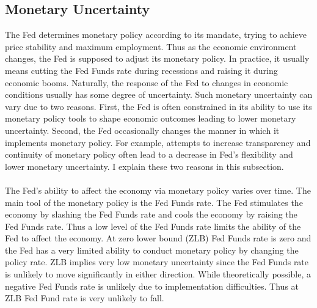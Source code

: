 \documentclass[12pt]{article}
\begin{document}
\subsection{Monetary Uncertainty} \label{sec:Model}

The Fed determines monetary policy according to its mandate, trying to achieve price stability and maximum employment. Thus as the economic environment changes, the Fed is supposed to adjust its monetary policy. In practice, it usually means cutting the Fed Funds rate during recessions and raising it during economic booms. Naturally, the response of the Fed to changes in economic conditions usually has some degree of uncertainty. Such monetary uncertainty can vary due to two reasons. First, the Fed is often constrained in its ability to use its monetary policy tools to shape economic outcomes leading to lower monetary uncertainty. Second, the Fed occasionally changes the manner in which it implements monetary policy. For example, attempts to increase transparency and continuity of monetary policy often lead to a decrease in Fed's flexibility and lower monetary uncertainty. I explain these two reasons in this subsection.
\paragraph{}
The Fed's ability to affect the economy via monetary policy varies over time. The main tool of the monetary policy is the Fed Funds rate. The Fed stimulates the economy by slashing the Fed Funds rate and cools the economy by raising the Fed Funds rate. Thus a low level of the Fed Funds rate limits the ability of the Fed to affect the economy. At zero lower bound (ZLB) Fed Funds rate is zero and the Fed has a very limited ability to conduct monetary policy by changing the policy rate. ZLB implies very low monetary uncertainty since the Fed Funds rate is unlikely to move significantly in either direction. While theoretically possible, a negative Fed Funds rate is unlikely due to implementation difficulties. Thus at ZLB Fed Fund rate is very unlikely to fall.
\end{document}
